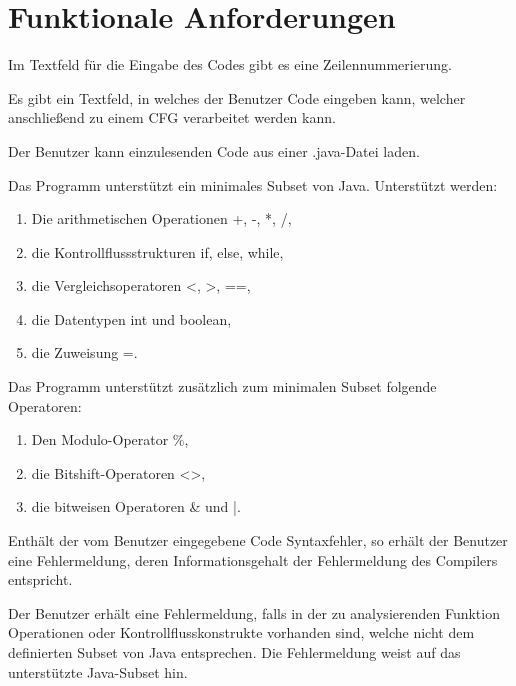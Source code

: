 
\section{Funktionale Anforderungen}

Im Textfeld für die Eingabe des Codes gibt es eine Zeilennummerierung.

Es gibt ein Textfeld, in welches der Benutzer Code eingeben kann, welcher anschließend zu einem CFG verarbeitet werden kann.

Der Benutzer kann einzulesenden Code aus einer .java-Datei laden.

Das Programm unterstützt ein minimales Subset von Java.
Unterstützt werden:
\begin{enumerate}[label=(\alph*)]
\item Die arithmetischen Operationen +, -, *, /,
\item die Kontrollflussstrukturen if, else, while,
\item die Vergleichsoperatoren <, >, ==,
\item die Datentypen int und boolean,
\item die Zuweisung =.
\end{enumerate}

Das Programm unterstützt zusätzlich zum minimalen Subset folgende Operatoren:
\begin{enumerate}[label=(\alph*)]
\item Den Modulo-Operator \%,
\item die Bitshift-Operatoren <\null>,
\item die bitweisen Operatoren \& und |.
\end{enumerate}

Enthält der vom Benutzer eingegebene Code Syntaxfehler, so erhält der Benutzer eine Fehlermeldung, deren Informationsgehalt der Fehlermeldung des Compilers entspricht.

Der Benutzer erhält eine Fehlermeldung, falls in der zu analysierenden Funktion Operationen oder Kontrollflusskonstrukte vorhanden sind, welche nicht dem definierten Subset von Java entsprechen. Die Fehlermeldung weist auf das unterstützte Java-Subset hin.

